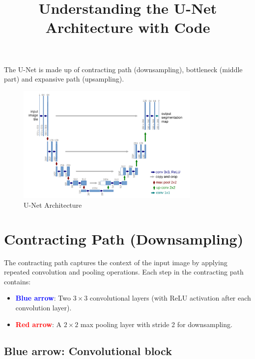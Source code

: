 \documentclass{article}
\title{Understanding the U-Net Architecture with Code}
\author{}
\date{}
\begin{document}
\maketitle

The U-Net is made up of contracting path (downsampling), bottleneck (middle part) and expansive path (upsampling).

\begin{figure}[H]
    \centering
    \includegraphics[width=0.8\textwidth]{unet.png}
    \caption{U-Net Architecture}
    \label{fig:unet}
\end{figure}

\tableofcontents
\newpage

\section{Contracting Path (Downsampling)}

The contracting path captures the context of the input image by applying repeated convolution and pooling operations. Each step in the contracting path contains:

\begin{itemize}
    \item \textbf{\textcolor{blue}{Blue arrow}}: Two $3 \times 3$ convolutional layers (with ReLU activation after each convolution layer).
    \item \textbf{\textcolor{red}{Red arrow}}: A $2 \times 2$ max pooling layer with stride 2 for downsampling.
\end{itemize}





\subsection{Blue arrow: Convolutional block}
\end{document}
